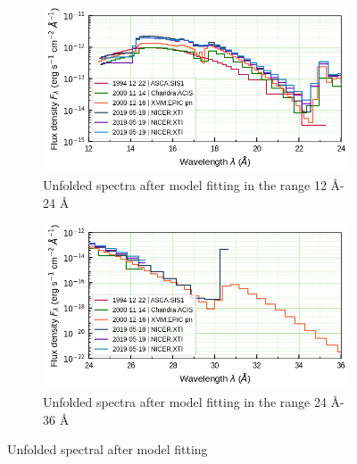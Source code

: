     \begin{figure}[!htb]
        \centering
        \begin{subfigure}[b]{0.45\textwidth}
            \includegraphics[width=\textwidth]{figures/eufspec/mr-vel-uf_all-obs_12-24.png}
            \caption{Unfolded spectra after model fitting in the range 12 \AA - 24 \AA}
            \label{fig:all-uf:12-24}
        \end{subfigure}
        \hfill
        \begin{subfigure}[b]{0.45\textwidth}
            \includegraphics[width=\textwidth]{figures/eufspec/mr-vel-uf_all-obs_24-36.png}
            \caption{Unfolded spectra after model fitting in the range 24 \AA - 36 \AA}
            \label{fig:all-uf:24-36}
        \end{subfigure}
        \caption{Unfolded spectral after model fitting}
        \label{fig:all-uf}
    \end{figure}

